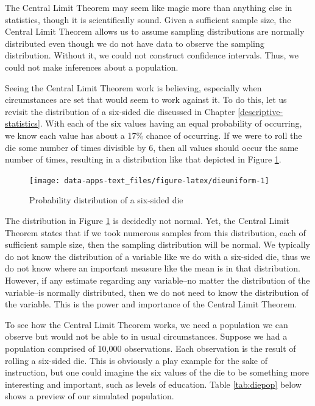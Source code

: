 \documentclass[
]{book}
\begin{document}
The Central Limit Theorem may seem like magic more than anything else in statistics, though it is scientifically sound. Given a sufficient sample size, the Central Limit Theorem allows us to assume sampling distributions are normally distributed even though we do not have data to observe the sampling distribution. Without it, we could not construct confidence intervals. Thus, we could not make inferences about a population.

Seeing the Central Limit Theorem work is believing, especially when circumstances are set that would seem to work against it. To do this, let us revisit the distribution of a six-sided die discussed in Chapter \ref{descriptive-statistics}. With each of the six values having an equal probability of occurring, we know each value has about a 17\% chance of occurring. If we were to roll the die some number of times divisible by 6, then all values should occur the same number of times, resulting in a distribution like that depicted in Figure \ref{fig:dieuniform}.

\begin{figure}

{\centering \texttt{[image: data-apps-text\_files/figure-latex/dieuniform-1]} 

}

\caption{Probability distribution of a six-sided die}\label{fig:dieuniform}
\end{figure}

The distribution in Figure \ref{fig:dieuniform} is decidedly not normal. Yet, the Central Limit Theorem states that if we took numerous samples from this distribution, each of sufficient sample size, then the sampling distribution will be normal. We typically do not know the distribution of a variable like we do with a six-sided die, thus we do not know where an important measure like the mean is in that distribution. However, if any estimate regarding any variable--no matter the distribution of the variable--is normally distributed, then we do not need to know the distribution of the variable. This is the power and importance of the Central Limit Theorem.

To see how the Central Limit Theorem works, we need a population we can observe but would not be able to in usual circumstances. Suppose we had a population comprised of 10,000 observations. Each observation is the result of rolling a six-sided die. This is obviously a play example for the sake of instruction, but one could imagine the six values of the die to be something more interesting and important, such as levels of education. Table \ref{tab:diepop} below shows a preview of our simulated population.
\end{document}
